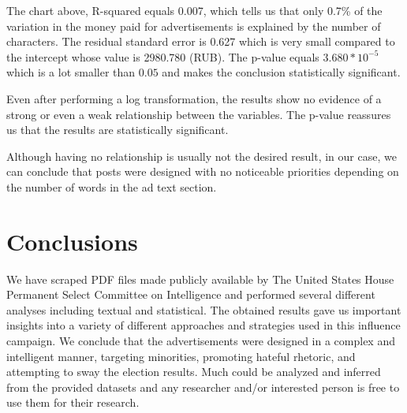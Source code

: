 \documentclass{article}
\begin{document}
The chart above, R-squared equals 0.007, which tells us that only 0.7\%
of the variation in the money paid for advertisements is explained by the
number of characters. The residual standard error is 0.627 which is very small
compared to the intercept whose value is 2980.780 (RUB). The p-value equals
$3.680 * 10^{-5}$ which is a lot smaller than $0.05$ and makes the conclusion
statistically significant.

\medskip

Even after performing a log transformation, the results show no evidence of a
strong or even a weak relationship between the variables. The p-value reassures
us that the results are statistically significant.

\medskip

Although having no relationship is usually not the desired result, in our case,
we can conclude that posts were designed with no noticeable priorities
depending on the number of words in the ad text section.


\section{Conclusions}

We have scraped PDF files made publicly available by The United States House
Permanent Select Committee on Intelligence and performed several different
analyses including textual and statistical. The obtained results gave us
important insights into a variety of different approaches and strategies used
in this influence campaign. We conclude that the advertisements were designed
in a complex and intelligent manner, targeting minorities, promoting hateful
rhetoric, and attempting to sway the election results. Much could be analyzed
and inferred from the provided datasets and any researcher and/or interested
person is free to use them for their research.


\printbibliography

\end{document}
